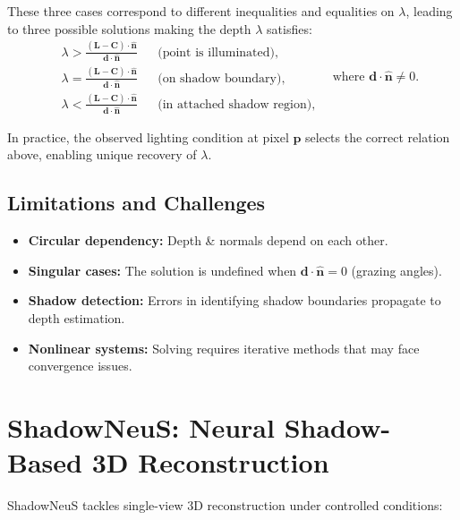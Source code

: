 \documentclass[12pt,a4paper]{article}
\theoremstyle{definition}
\newcommand{\vect}[1]{\bm{#1}}
\begin{document}
These three cases correspond to different inequalities and equalities on \(\lambda\), leading to three possible solutions making the depth \(\lambda\) satisfies:
\begin{equation}
\boxed{
\begin{aligned}
& \lambda > \frac{(\mathbf{L} - \mathbf{C}) \cdot \hat{\mathbf{n}}}{\mathbf{d} \cdot \hat{\mathbf{n}}} && \text{(point is illuminated)}, \\[6pt]
& \lambda = \frac{(\mathbf{L} - \mathbf{C}) \cdot \hat{\mathbf{n}}}{\mathbf{d} \cdot \hat{\mathbf{n}}} && \text{(on shadow boundary)}, \\[6pt]
& \lambda < \frac{(\mathbf{L} - \mathbf{C}) \cdot \hat{\mathbf{n}}}{\mathbf{d} \cdot \hat{\mathbf{n}}} && \text{(in attached shadow region)},
\end{aligned}
}
\quad \text{where } \mathbf{d} \cdot \hat{\mathbf{n}} \neq 0.
\label{eq:lambda_solution}
\end{equation}

In practice, the observed lighting condition at pixel $\mathbf{p}$ selects the correct relation above, enabling unique recovery of $\lambda$.

\vspace{-1em}

\subsection{Limitations and Challenges}

\begin{itemize}[noitemsep, topsep=0pt]
    \item \textbf{Circular dependency:} Depth \& normals depend on each other.
    \item \textbf{Singular cases:} The solution is undefined when $\vect{d} \cdot \hat{\vect{n}} = 0$ (grazing angles).
    \item \textbf{Shadow detection:} Errors in identifying shadow boundaries propagate to depth estimation.
    \item \textbf{Nonlinear systems:} Solving requires iterative methods that may face convergence issues.
\end{itemize}

\newpage

\section{ShadowNeuS: Neural Shadow-Based 3D Reconstruction}
ShadowNeuS tackles single-view 3D reconstruction under controlled conditions:
\end{document}
